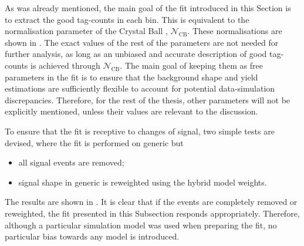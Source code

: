 As was already mentioned, the main goal of the \Mbc fit introduced in this Section is to extract the good tag-\B counts in each \EB bin.
This is equivalent to the normalisation parameter of the Crystal Ball \PDF, $\mathcal{N}_{\mathrm{CB}}$.
These normalisations are shown in .
The exact values of the rest of the parameters are not needed for further analysis, as long as an unbiased and accurate description of good tag-\B counts is achieved through $\mathcal{N}_{\mathrm{CB}}$.
The main goal of keeping them as free parameters in the fit is to ensure that the \Mbc background shape and yield estimations are sufficiently flexible to account for potential data-simulation discrepancies.
Therefore, for the rest of the thesis, other parameters will not be explicitly mentioned, unless their values are relevant to the discussion.

To ensure that the fit is receptive to changes of \BtoXsgamma signal, two simple tests are devised, where the fit is performed on generic \MC but
\begin{itemize}
    \item all \BtoXsgamma signal events are removed;
    \item \BtoXsgamma signal shape in generic \MC is reweighted using the hybrid model weights.
\end{itemize}
The results are shown in .
It is clear that if the \BtoXsgamma events are completely removed or reweighted, the \Mbc fit presented in this Subsection responds appropriately.
Therefore, although a particular simulation model was used when preparing the fit, no particular bias towards any \BtoXsgamma model is introduced.

